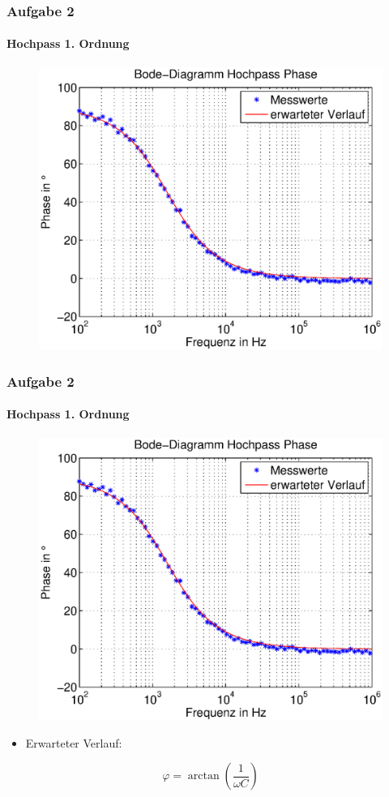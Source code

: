 \begin{frame}
    \frametitle{Aufgabe 2}
    \framesubtitle{Hochpass 1. Ordnung}
     \begin{figure}[H]
     \begin{center}
             \includegraphics[scale=0.60]{./img/2b_bode_hoch_phase.eps}
     \end{center}
     \end{figure}
\end{frame}
\begin{frame}
    \frametitle{Aufgabe 2}
    \framesubtitle{Hochpass 1. Ordnung}
     \begin{figure}[H]
     \begin{center}
             \includegraphics[scale=0.45]{./img/2b_bode_hoch_phase.eps}
     \end{center}
     \end{figure}
     \begin{itemize}
         \item Erwarteter Verlauf: 
     \end{itemize}
     \begin{equation*}
            \varphi = \arctan \left( \frac{1}{\omega C} \right)
     \end{equation*}
\end{frame}
